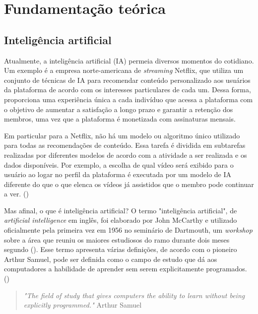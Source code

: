 
\chapter{Fundamentação teórica}

\section{Inteligência artificial}

Atualmente, a inteligência artificial (IA) permeia diversos 
momentos do cotidiano. Um exemplo é a empresa norte-americana 
de \textit{streaming} Netflix, que utiliza um conjunto de 
técnicas de IA para recomendar conteúdo personalizado aos 
usuários da plataforma de acordo com os interesses 
particulares de cada um. Dessa forma, proporciona uma 
experiência única a cada indivíduo que acessa a plataforma 
com o objetivo de aumentar a satisfação a longo prazo e
 garantir a retenção dos membros, uma vez 
que a plataforma é monetizada com assinaturas mensais. 

Em particular para a Netflix, não há um modelo ou algoritmo único utilizado 
para todas as recomendações de conteúdo. Essa tarefa é 
dividida em subtarefas realizadas por diferentes modelos de 
acordo com a atividade a ser realizada e os dados disponíveis. 
Por exemplo, a escolha de qual vídeo será exibido para 
o usuário ao logar no perfil da plataforma é executada por um 
modelo de IA diferente do que o que elenca os vídeos já assistidos que o 
membro pode continuar a ver. (\cite{netflix})

Mas afinal, o que é inteligência artificial? O termo 
"inteligência artificial", de \textit{artificial intelligence} 
em inglês, foi elaborado por John McCarthy e utilizado 
oficialmente pela primeira vez em 1956 no seminário de 
Dartmouth, um \textit{workshop} sobre a área que reuniu os 
maiores estudiosos do ramo durante dois meses segundo (\cite{aima}).
Esse termo apresenta várias definições, de acordo com o 
pioneiro Arthur Samuel, pode ser definida como o campo de 
estudo que dá aos computadores a habilidade de aprender sem 
serem explicitamente programados. (\cite{dl-oreilly}) 

\begin{quote}
  \textit{"The field of study that gives computers the 
  ability to learn without being explicitly
  programmed."} Arthur Samuel
\end{quote}

